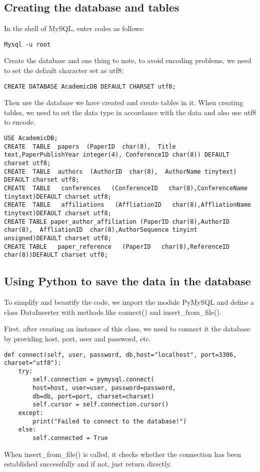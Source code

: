 \documentclass{article}
\begin{document}
        \subsection{Creating the database and tables}
In the shell of MySQL, enter codes as follows:
            \begin{verbatim}
Mysql -u root
            \end{verbatim}
Create  the  database  and  one  thing  to  note,  to  avoid  encoding
problems, we need to set the default character set as utf8:
            \begin{verbatim}
CREATE DATABASE AcademicDB DEFAULT CHARSET utf8;
            \end{verbatim}
Then use the database we have created and create tables in it. When
creating tables, we need to set the data type in accordance with the
data and also use utf8 to encode.
            \begin{verbatim}
USE AcademicDB;
CREATE  TABLE  papers  (PaperID  char(8),  Title  text,PaperPublishYear integer(4), ConferenceID char(8)) DEFAULT charset utf8;
CREATE  TABLE  authors  (AuthorID  char(8),  AuthorName tinytext) DEFAULT charset utf8;
CREATE  TABLE   conferences   (ConferenceID   char(8),ConferenceName tinytext)DEFAULT charset utf8;
CREATE  TABLE   affiliations   (AffliationID   char(8),AffliationName tinytext)DEFAULT charset utf8;
CREATE TABLE paper_author_affiliation (PaperID char(8),AuthorID  char(8),  AffliationID  char(8),AuthorSequence tinyint unsigned)DEFAULT charset utf8;
CREATE TABLE   paper_reference   (PaperID   char(8),ReferenceID char(8))DEFAULT charset utf8;
            \end{verbatim}
        \subsection{Using Python to save the data in the database}
To simplify and beautify the code, we import the module PyMySQL and define  a  class  DataInserter  with  methods  like  connect()  and insert\_from\_file().

First, after creating an instance of this class, we need to connect
it the database by providing host, port, user and password, etc.
            \begin{verbatim}
def connect(self, user, password, db,host="localhost", port=3306, charset="utf8"):
    try:
        self.connection = pymysql.connect(
        host=host, user=user, password=password,
        db=db, port=port, charset=charset)
        self.cursor = self.connection.cursor()
    except:
        print("Failed to connect to the database!")
    else:
        self.connected = True
            \end{verbatim}
When insert\_from\_file() is called, it checks whether the connection
has been established successfully and if not, just return directly.
\end{document}
